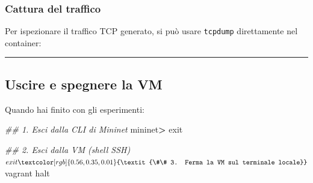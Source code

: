 \documentclass[
  italian,
  openany]{book}
\newenvironment{Shaded}{\begin{snugshade}}{\end{snugshade}}
\newcommand{\AttributeTok}[1]{\textcolor[rgb]{0.13,0.29,0.53}{#1}}
\newcommand{\CommentTok}[1]{\textcolor[rgb]{0.56,0.35,0.01}{\textit{#1}}}
\newcommand{\ExtensionTok}[1]{#1}
\newcommand{\FunctionTok}[1]{\textcolor[rgb]{0.13,0.29,0.53}{\textbf{#1}}}
\newcommand{\KeywordTok}[1]{\textcolor[rgb]{0.13,0.29,0.53}{\textbf{#1}}}
\newcommand{\NormalTok}[1]{#1}
\newcommand{\OperatorTok}[1]{\textcolor[rgb]{0.81,0.36,0.00}{\textbf{#1}}}
\newcommand{\VariableTok}[1]{\textcolor[rgb]{0.00,0.00,0.00}{#1}}
\begin{document}
\subsubsection{Cattura del traffico}\label{cattura-del-traffico}

Per ispezionare il traffico TCP generato, si può usare \texttt{tcpdump}
direttamente nel container:

\begin{Shaded}
\end{Shaded}

\begin{center}\rule{0.5\linewidth}{0.5pt}\end{center}

\subsection{Uscire e spegnere la VM}\label{uscire-e-spegnere-la-vm}

Quando hai finito con gli esperimenti:

\begin{Shaded}
\begin{Highlighting}[]
\CommentTok{\#\# 1. Esci dalla CLI di Mininet}
\ExtensionTok{mininet}\OperatorTok{\textgreater{}}\NormalTok{ exit}

\CommentTok{\#\# 2. Esci dalla VM (shell SSH)}
\ExtensionTok{$}\NormalTok{ exit}

\CommentTok{\#\# 3. Ferma la VM sul terminale locale}
\ExtensionTok{$}\NormalTok{ vagrant halt}
\end{Highlighting}
\end{Shaded}
\end{document}
